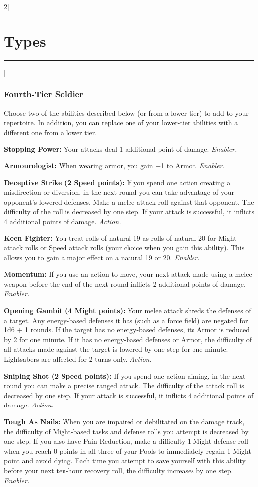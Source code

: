 \documentclass[a4paper,10pt,final]{book}
\newcommand{\HRule}{\rule{\linewidth}{0.5mm}} %
\newcommand{\newSection}[1]{\section*{#1} \addcontentsline{toc}{section}{#1} \label{sec:#1} \HRule}
\newcommand{\itemAbility}[2]{\textcolor{25gray}{\textbullet\textbf{ #1:}} {#2}\par}
\newcommand{\enabler}{\textit{ Enabler.}}
\newcommand{\action}{\textit{ Action.}}
\newenvironment{docsection}[1]
{
  \begin{multicols*}{2}[\newSection{#1}]
}
{
  \end{multicols*}
  \newpage
}
\begin{document}
\begin{docsection}{Types}
\subsubsection*{Fourth-Tier Soldier}
\label{subsub:soldierFourthTier}
Choose two of the abilities described below (or from a lower tier) to add to your repertoire. In addition, you can replace one of your lower-tier abilities with a different one from a lower tier.\par
\itemAbility{Stopping Power}{Your attacks deal 1
additional point of damage.\enabler}
\itemAbility{Armourologist}{When wearing
armor, you gain +1 to Armor.\enabler}
\itemAbility{Deceptive Strike (2 Speed points)}{If you spend one
action creating a misdirection or diversion,
in the next round you can take advantage
of your opponent’s lowered defenses. Make
a melee attack roll against that opponent.
The difficulty of the roll is decreased by one
step. If your attack is successful, it inflicts 4
additional points of damage.\action}
\itemAbility{Keen Fighter}{You treat rolls of natural
19 as rolls of natural 20 for Might attack
rolls or Speed attack rolls (your choice when
you gain this ability). This allows you to gain
a major effect on a natural 19 or 20.\enabler}
\itemAbility{Momentum}{If you use an action to
move, your next attack made using a melee
weapon before the end of the next round
inflicts 2 additional points of damage.\enabler}
\itemAbility{Opening Gambit (4 Might points)}{Your
melee attack shreds the defenses of a
target. Any energy-based defenses it has
(such as a force field) are
negated for 1d6 + 1 rounds. If the target
has no energy-based defenses, its Armor
is reduced by 2 for one minute. If it has
no energy-based defenses or Armor, the
difficulty of all attacks made against the
target is lowered by one step for one
minute. Lightsabers are affected for 2 turns only.\action}
\itemAbility{Sniping Shot (2 Speed points)}{If you spend one
action aiming, in the next round you can
make a precise ranged attack. The difficulty
of the attack roll is decreased by one step.
If your attack is successful, it inflicts 4
additional points of damage.\action}
\itemAbility{Tough As Nails}{When you are impaired
or debilitated on the damage track, the
difficulty of Might-based tasks and defense rolls you attempt is decreased by one step.
If you also have Pain Reduction, make a
difficulty 1 Might defense roll when you
reach 0 points in all three of your Pools
to immediately regain 1 Might point and
avoid dying. Each time you attempt to
save yourself with this ability before your
next ten-hour recovery roll, the difficulty
increases by one step.\enabler}


\end{docsection}
\end{document}
